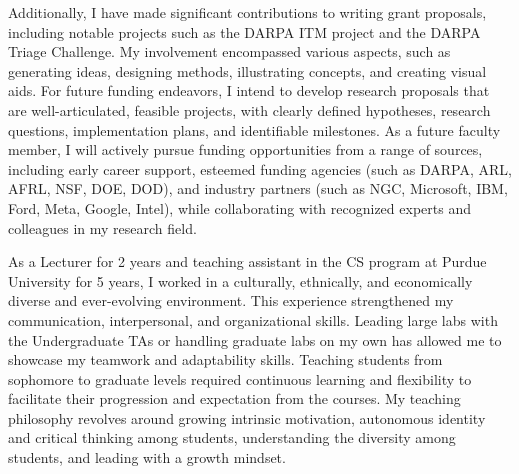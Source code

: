 \documentclass[10pt]{article}
\renewcommand*\paragraph[1]{}
\begin{document}
Additionally, I have made significant contributions to writing grant proposals, including notable projects such as the DARPA ITM project and the DARPA Triage Challenge. My involvement encompassed various aspects, such as generating ideas, designing methods, illustrating concepts, and creating visual aids. For future funding endeavors, I intend to develop research proposals that are well-articulated, feasible projects, with clearly defined hypotheses, research questions, implementation plans, and identifiable milestones. As a future faculty member, I will actively pursue funding opportunities from a range of sources, including early career support, esteemed funding agencies (such as DARPA, ARL, AFRL, NSF, DOE, DOD), and industry partners (such as NGC, Microsoft, IBM, Ford, Meta, Google, Intel), while collaborating with recognized experts and colleagues in my research field. 



\paragraph{2 and 3) Demonstrated ability to teach and interact with both undergraduate and graduate students}
As a Lecturer for 2 years and teaching assistant in the CS program at Purdue University for 5 years, I worked in a culturally, ethnically, and economically diverse and ever-evolving environment. This experience strengthened my communication, interpersonal, and organizational skills. 
Leading large labs with the Undergraduate TAs or handling graduate labs on my own has allowed me to showcase my teamwork and adaptability skills. Teaching students from sophomore to graduate levels required continuous learning and flexibility to facilitate their progression and expectation from the courses.
%
My teaching philosophy revolves around growing intrinsic motivation, autonomous identity and critical thinking among students, understanding the diversity among students, and leading with a growth mindset. 
%
\end{document}
